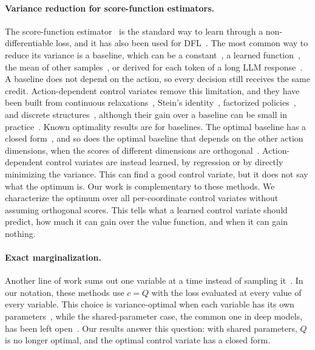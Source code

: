 \documentclass[10pt]{article}
\theoremstyle{plain}
\theoremstyle{definition}
\theoremstyle{remark}
\theoremstyle{definition}
\begin{document}
\paragraph{Variance reduction for score-function estimators.}
The score-function estimator~\cite{williams1992} is the standard way to learn through a non-differentiable loss, and it has also been used for DFL~\cite{silvestri2023}. The most common way to reduce its variance is a baseline, which can be a constant~\cite{weaver2001,greensmith2004}, a learned function~\cite{mnih2014nvil}, the mean of other samples~\cite{kool2019,shao2024}, or derived for each token of a long LLM response~\cite{otb2026}. A baseline does not depend on the action, so every decision still receives the same credit. Action-dependent control variates remove this limitation, and they have been built from continuous relaxations~\cite{tmm+17,GCW+18}, Stein's identity~\cite{liu2018}, factorized policies~\cite{wu2018}, and discrete structures~\cite{titsias2022,shi2022}, although their gain over a baseline can be small in practice~\cite{tucker2018}. Known optimality results are for baselines. The optimal baseline has a closed form~\cite{weaver2001,greensmith2004,otb2026}, and so does the optimal baseline that depends on the other action dimensions, when the scores of different dimensions are orthogonal~\cite{wu2018}. Action-dependent control variates are instead learned, by regression or by directly minimizing the variance. This can find a good control variate, but it does not say what the optimum is. Our work is complementary to these methods. We characterize the optimum over all per-coordinate control variates without assuming orthogonal scores. This tells what a learned control variate should predict, how much it can gain over the value function, and when it can gain nothing.

\paragraph{Exact marginalization.}
Another line of work sums out one variable at a time instead of sampling it~\cite{titsias2015,liu2019,tokui2017,SSM23}. In our notation, these methods use $c=Q$ with the loss evaluated at every value of every variable. This choice is variance-optimal when each variable has its own parameters~\cite{tokui2017}, while the shared-parameter case, the common one in deep models, has been left open~\cite{SSM23}. Our results answer this question: with shared parameters, $Q$ is no longer optimal, and the optimal control variate has a closed form.
\end{document}
